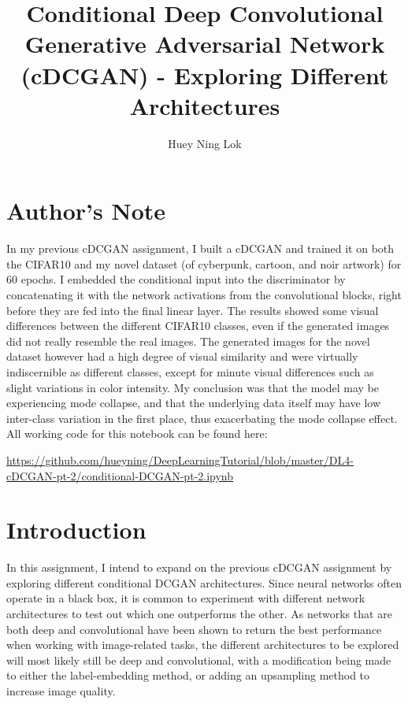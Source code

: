 \documentclass[11pt]{article}
\title{Conditional Deep Convolutional Generative Adversarial Network
(cDCGAN) - Exploring Different
Architectures}
\author{Huey Ning Lok}
\begin{document}
    
    
    \maketitle
    
  

\section{Author's Note}\label{authors-note}

In my previous cDCGAN assignment, I built a cDCGAN and trained it on
both the CIFAR10 and my novel dataset (of cyberpunk, cartoon, and noir
artwork) for 60 epochs. I embedded the conditional input into the
discriminator by concatenating it with the network activations from the
convolutional blocks, right before they are fed into the final linear
layer. The results showed some visual differences between the different
CIFAR10 classes, even if the generated images did not really resemble
the real images. The generated images for the novel dataset however had
a high degree of visual similarity and were virtually indiscernible as
different classes, except for minute visual differences such as slight
variations in color intensity. My conclusion was that the model may be
experiencing mode collapse, and that the underlying data itself may have
low inter-class variation in the first place, thus exacerbating the mode
collapse effect.\\

All working code for this notebook can be found here:

\url{https://github.com/hueyning/DeepLearningTutorial/blob/master/DL4-cDCGAN-pt-2/conditional-DCGAN-pt-2.ipynb}

\section{Introduction}\label{introduction}

In this assignment, I intend to expand on the previous cDCGAN assignment
by exploring different conditional DCGAN architectures. Since neural
networks often operate in a black box, it is common to experiment with
different network architectures to test out which one outperforms the
other. As networks that are both deep and convolutional have been shown
to return the best performance when working with image-related tasks,
the different architectures to be explored will most likely still be
deep and convolutional, with a modification being made to either the
label-embedding method, or adding an upsampling method to increase image
quality.
\end{document}
